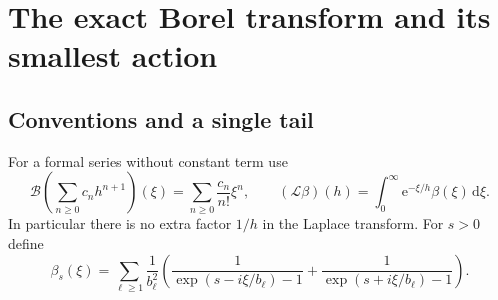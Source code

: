 \documentclass[11pt,a4paper]{article}
\numberwithin{equation}{section}
\theoremstyle{definition}\newtheorem{definition}[theorem]{Definition}
\theoremstyle{remark}\newtheorem{remark}[theorem]{Remark}
\newcommand{\e}{\mathrm e}
\newcommand{\dd}{\,\mathrm d}
\newcommand{\calB}{\mathscr B}
\newcommand{\calL}{\mathcal L}
\begin{document}
\section{The exact Borel transform and its smallest action}
\label{sec:borel}

\subsection{Conventions and a single tail}
For a formal series without constant term use
\begin{equation}
 \calB\!\left(\sum_{n\ge0}c_nh^{n+1}\right)(\xi)
       =\sum_{n\ge0}\frac{c_n}{n!}\xi^n,
 \qquad (\calL\beta)(h)=\int_0^\infty\e^{-\xi/h}\beta(\xi)\dd\xi.
 \label{eq:Borel-convention}
\end{equation}
In particular there is no extra factor $1/h$ in the Laplace transform.
For $s>0$ define
\begin{equation}
 \beta_s(\xi)=\sum_{\ell\ge1}\frac1{b_\ell^2}
 \left(\frac1{\exp(s-i\xi/b_\ell)-1}
       +\frac1{\exp(s+i\xi/b_\ell)-1}\right).
 \label{eq:beta-single}
\end{equation}
\end{document}
